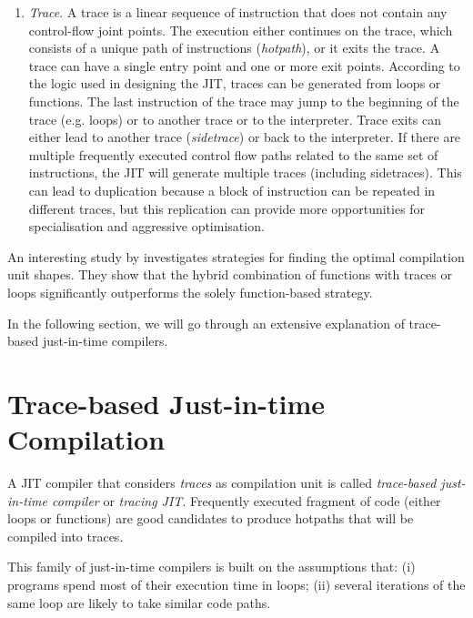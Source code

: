 \begin{enumerate}
    \item \textit{Trace}. A trace is a linear sequence of instruction that does not contain any control-flow joint points. The execution either continues on the trace, which consists of a unique path of instructions (\textit{hotpath}), or it exits the trace. A trace can have a single entry point and one or more exit points. According to the logic used in designing the JIT, traces can be generated from loops or functions. The last instruction of the trace may jump to the beginning of the trace (e.g. loops) or to another trace or to the interpreter. Trace exits can either lead to another trace (\textit{sidetrace}) or back to the interpreter. If there are multiple frequently executed control flow paths related to the same set of instructions, the JIT will generate multiple traces (including sidetraces). This can lead to duplication because a block of instruction can be repeated in different traces, but this replication can provide more opportunities for specialisation and aggressive optimisation.
    
\end{enumerate}

\noindent
An interesting study by \citeauthor{bruening2000exploring} \cite{bruening2000exploring} investigates strategies for finding the optimal compilation unit shapes. They show that the hybrid combination of functions with traces or loops significantly outperforms the solely function-based strategy.

In the following section, we will go through an extensive explanation of trace-based just-in-time compilers.

\section{Trace-based Just-in-time Compilation}
A JIT compiler that considers \textit{traces} as compilation unit is called \textit{trace-based just-in-time compiler} or \textit{tracing JIT}. Frequently executed fragment of code (either loops or functions) are good candidates to produce hotpaths that will be compiled into traces.

This family of just-in-time compilers is built on the assumptions that: (i) programs spend most of their execution time in loops; (ii) several iterations of the same loop are likely to take similar code paths.

